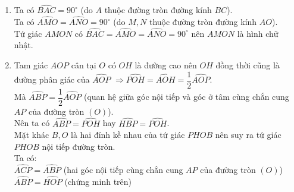 \begin{bt}
{\begin{center}
		\end{center}
		\begin{enumerate}
			\item 
			Ta có $\widehat{BAC}=90^\circ$ (do $A$ thuộc đường tròn đường kính $BC$).\\
			Ta có $\widehat{AMO}=\widehat{ANO}=90^\circ$ (do $M,N$ thuộc đường tròn đường kính $AO$).\\
			Tứ giác $AMON$ có $\widehat{BAC}=\widehat{AMO}=\widehat{ANO}=90^\circ$ nên $AMON$ là hình chữ nhật. 
			\item 
			Tam giác $AOP$ cân tại $O$ có $OH$ là đường cao nên $OH$ đồng thời cũng là đường phân giác của $\widehat{AOP}$ $\Rightarrow \widehat{POH}=\widehat{AOH}=\dfrac{1}{2}\widehat{AOP}$.\\
			Mà $\widehat{ABP}=\dfrac{1}{2}\widehat{AOP}$ (quan hệ giữa góc nội tiếp và góc ở tâm cùng chắn cung $AP$ của đường tròn $(O)$).\\
			Nên ta có $\widehat{ABP}=\widehat{POH}$ hay $\widehat{HBP}=\widehat{POH}$.\\
			Mặt khác $B,O$ là hai đỉnh kề nhau của tứ giác $PHOB$ nên suy ra tứ giác $PHOB$ nội tiếp đường tròn.\\
			Ta có:\\
			$\widehat{ACP}=\widehat{ABP}$ (hai góc nội tiếp cùng chắn cung $AP$ của đường tròn $(O)$)\\
			$\widehat{ABP}=\widehat{HOP}$ (chứng minh trên)\\

\end{enumerate}}
\end{bt}
